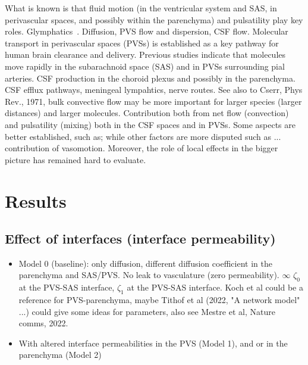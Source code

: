 What is known is that fluid motion (in the ventricular system and SAS,
in perivascular spaces, and possibly within the parenchyma) and
pulsatility play key
roles. Glymphatics~\cite{iliff2012paravascular}. Diffusion, PVS flow
and dispersion, CSF flow. Molecular transport in perivascular spaces
(PVSs) is established as a key pathway for human brain clearance and
delivery. Previous studies indicate that molecules move rapidly in the
subarachnoid space (SAS) and in PVSs surrounding pial arteries. CSF
production in the choroid plexus and possibly in the parenchyma. CSF
efflux pathways, meningeal lympahtics, nerve routes. See also to
Cserr, Phys Rev., 1971, bulk convective flow may be more important for
larger species (larger distances) and larger molecules. Contribution
both from net flow (convection) and pulsatility (mixing) both in the
CSF spaces and in PVSs. Some aspects are better established, such as;
while other factors are more disputed such as ... contribution of
vasomotion. Moreover, the role of local effects in the bigger picture
has remained hard to evaluate.

\section{Results}

\subsection*{Effect of interfaces (interface permeability)}

\begin{itemize}
    \item Model 0 (baseline): only diffusion, different diffusion coefficient in the parenchyma and SAS/PVS. No leak to vasculature (zero permeability). $\infty$ $\zeta_0$ at the PVS-SAS interface, $\zeta_1$ at the PVS-SAS interface. Koch et al could be a reference for PVS-parenchyma, maybe Tithof et al (2022, "A network model" ...) could give some ideas for parameters, also see Mestre et al, Nature comms, 2022. 
    \item 
    With altered interface permeabilities in the PVS (Model 1), and or in the parenchyma (Model 2) 
    \end{itemize}


